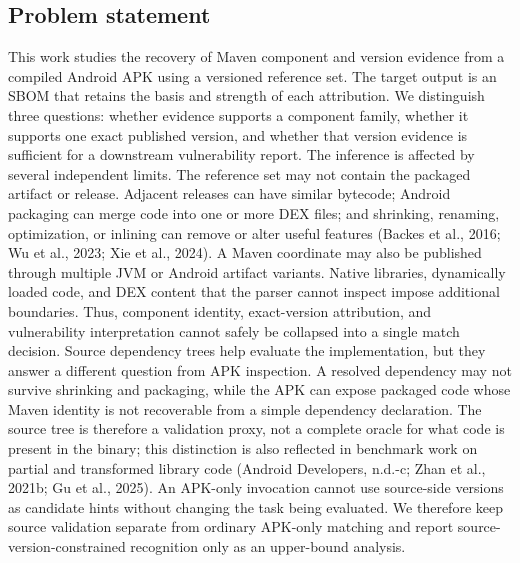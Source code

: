 \documentclass[10pt,twocolumn]{article}
\begin{document}
\subsection{Problem statement}
This work studies the recovery of Maven component and version evidence from a compiled Android APK using a versioned reference set. The target output is an SBOM that retains the basis and strength of each attribution. We distinguish three questions: whether evidence supports a component family, whether it supports one exact published version, and whether that version evidence is sufficient for a downstream vulnerability report.
The inference is affected by several independent limits. The reference set may not contain the packaged artifact or release. Adjacent releases can have similar bytecode; Android packaging can merge code into one or more DEX files; and shrinking, renaming, optimization, or inlining can remove or alter useful features (Backes et al., 2016; Wu et al., 2023; Xie et al., 2024). A Maven coordinate may also be published through multiple JVM or Android artifact variants. Native libraries, dynamically loaded code, and DEX content that the parser cannot inspect impose additional boundaries. Thus, component identity, exact-version attribution, and vulnerability interpretation cannot safely be collapsed into a single match decision.
Source dependency trees help evaluate the implementation, but they answer a different question from APK inspection. A resolved dependency may not survive shrinking and packaging, while the APK can expose packaged code whose Maven identity is not recoverable from a simple dependency declaration. The source tree is therefore a validation proxy, not a complete oracle for what code is present in the binary; this distinction is also reflected in benchmark work on partial and transformed library code (Android Developers, n.d.-c; Zhan et al., 2021b; Gu et al., 2025). An APK-only invocation cannot use source-side versions as candidate hints without changing the task being evaluated. We therefore keep source validation separate from ordinary APK-only matching and report source-version-constrained recognition only as an upper-bound analysis.
\end{document}
